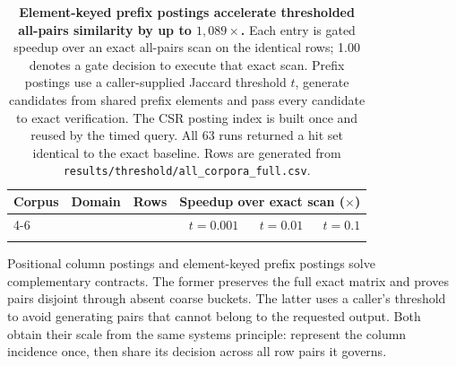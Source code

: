 \begin{table}[!ht]
\scriptsize
\setlength{\tabcolsep}{5.0pt}
\renewcommand\arraystretch{1.02}
\centering
\caption{\textbf{Element-keyed prefix postings accelerate thresholded all-pairs similarity by up
to $1{,}089\times$.} Each entry is gated speedup over an exact all-pairs scan on the identical rows;
1.00 denotes a gate decision to execute that exact scan. Prefix postings use a caller-supplied
Jaccard threshold $t$, generate candidates from shared prefix elements and pass every candidate to
exact verification. The CSR posting index is built once and reused by the timed query. All 63 runs
returned a hit set identical to the exact baseline. Rows are generated from
\texttt{results/threshold/all\_corpora\_full.csv}.}
\label{tab:threshold}
\begin{tabular}{@{}l l r r r r@{}}
\toprule
Corpus & Domain & Rows & \multicolumn{3}{c}{Speedup over exact scan ($\times$)} \\
\cmidrule(lr){4-6}
& & & $t=0.001$ & $t=0.01$ & $t=0.1$ \\
\midrule
\tabularnewline
\bottomrule
\end{tabular}
\end{table}

Positional column postings and element-keyed prefix postings solve complementary contracts. The
former preserves the full exact matrix and proves pairs disjoint through absent coarse buckets. The
latter uses a caller's threshold to avoid generating pairs that cannot belong to the requested
output. Both obtain their scale from the same systems principle: represent the column incidence once,
then share its decision across all row pairs it governs.

\clearpage
